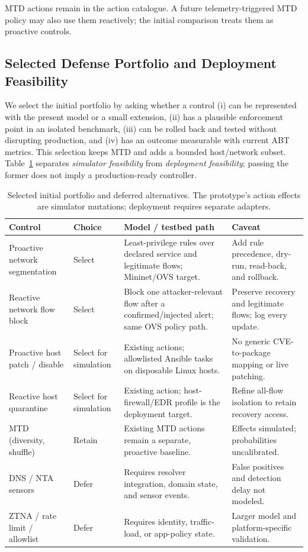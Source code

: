 \documentclass[conference]{IEEEtran}
\begin{document}
\noindent *MTD actions remain in the action catalogue. A future telemetry-triggered
MTD policy may also use them reactively; the initial comparison treats them as
proactive controls.

\subsection{Selected Defense Portfolio and Deployment Feasibility}
\label{sec:portfolio}

We select the initial portfolio by asking whether a control (i) can be represented
with the present model or a small extension, (ii) has a plausible enforcement point
in an isolated benchmark, (iii) can be rolled back and tested without disrupting
production, and (iv) has an outcome measurable with current ABT metrics. This
selection keeps MTD and adds a bounded host/network subset. Table~\ref{tab:portfolio}
separates \emph{simulator feasibility} from \emph{deployment feasibility}; passing
the former does not imply a production-ready controller.

\begin{table}[t]
\centering
\small
\setlength{\tabcolsep}{2pt}
\caption{Selected initial portfolio and deferred alternatives. The prototype's
action effects are simulator mutations; deployment requires separate adapters.}
\label{tab:portfolio}
\begin{tabular}{@{}p{}p{}p{}p{}@{}}
\toprule
Control & Choice & Model / testbed path & Caveat \\
\midrule
Proactive network segmentation & Select & Least-privilege rules over declared service and legitimate flows; Mininet/OVS target. & Add rule precedence, dry-run, read-back, and rollback. \\
Reactive network flow block & Select & Block one attacker-relevant flow after a confirmed/injected alert; same OVS policy path. & Preserve recovery and legitimate flows; log every update. \\
Proactive host patch / disable & Select for simulation & Existing actions; allowlisted Ansible tasks on disposable Linux hosts. & No generic CVE-to-package mapping or live patching. \\
Reactive host quarantine & Select for simulation & Existing action; host-firewall/EDR profile is the deployment target. & Refine all-flow isolation to retain recovery access. \\
MTD (diversity, shuffle) & Retain & Existing MTD actions remain a separate, proactive baseline. & Effects simulated; probabilities uncalibrated. \\
DNS / NTA sensors & Defer & Requires resolver integration, domain state, and sensor events. & False positives and detection delay not modeled. \\
ZTNA / rate limit / allowlist & Defer & Requires identity, traffic-load, or app-policy state. & Larger model and platform-specific validation. \\
\bottomrule
\end{tabular}
\end{table}
\end{document}
